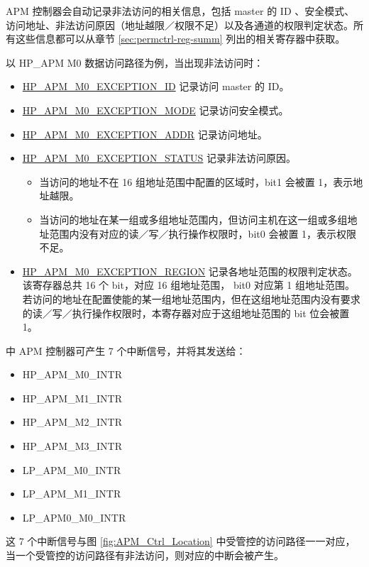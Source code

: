 \documentclass[main\_\_CN.tex]{subfiles}
\begin{document}
APM 控制器会自动记录非法访问的相关信息，包括 master 的 ID 、安全模式、访问地址、非法访问原因（地址越限／权限不足）以及各通道的权限判定状态。所有这些信息都可以从章节 \ref{sec:permctrl-reg-summ}  列出的相关寄存器中获取。

以 HP\_APM M0 数据访问路径为例，当出现非法访问时：
\begin{itemize}
    \item \hyperref[fielddesc:HPAPMM0EXCEPTIONID]{HP\_APM\_M0\_EXCEPTION\_ID} 记录访问 master 的 ID。
    \item \hyperref[fielddesc:HPAPMM0EXCEPTIONMODE]{HP\_APM\_M0\_EXCEPTION\_MODE} 记录访问安全模式。
    \item \hyperref[fielddesc:HPAPMM0EXCEPTIONADDR]{HP\_APM\_M0\_EXCEPTION\_ADDR} 记录访问地址。
    \item \hyperref[fielddesc:HPAPMM0EXCEPTIONSTATUS]{HP\_APM\_M0\_EXCEPTION\_STATUS} 记录非法访问原因。
    \begin{itemize}
        \item  当访问的地址不在 16 组地址范围中配置的区域时，bit1 会被置 1，表示地址越限。
        \item  当访问的地址在某一组或多组地址范围内，但访问主机在这一组或多组地址范围内没有对应的读／写／执行操作权限时，bit0 会被置 1，表示权限不足。
    \end{itemize}
    \item \hyperref[fielddesc:HPAPMM0EXCEPTIONREGION]{HP\_APM\_M0\_EXCEPTION\_REGION} 记录各地址范围的权限判定状态。该寄存器总共 16 个 bit，对应 16 组地址范围， bit0 对应第 1 组地址范围。若访问的地址在配置使能的某一组地址范围内，但在这组地址范围内没有要求的读／写／执行操作权限时，本寄存器对应于这组地址范围的 bit 位会被置1。


\end{itemize}

\chipname{} 中 APM 控制器可产生 7 个中断信号，并将其发送给\textit{}：
    \begin{itemize}
    \item HP\_APM\_M0\_INTR
    \item HP\_APM\_M1\_INTR
    \item HP\_APM\_M2\_INTR
    \item HP\_APM\_M3\_INTR
    \item LP\_APM\_M0\_INTR
    \item LP\_APM\_M1\_INTR
    \item LP\_APM0\_M0\_INTR
    \end{itemize}这 7 个中断信号与图 \ref{fig:APM_Ctrl_Location} 中受管控的访问路径一一对应，当一个受管控的访问路径有非法访问，则对应的中断会被产生。
\end{document}
